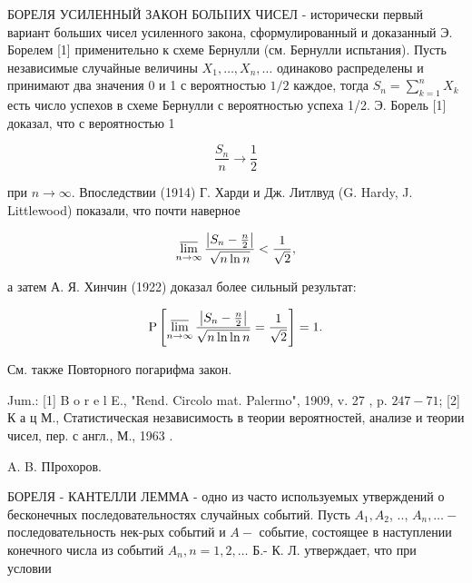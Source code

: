 \documentclass[10pt]{article}
\begin{document}
БОРЕЛЯ УСИЛЕННЫЙ ЗАКОН БОЛЬIIИХ ЧИСЕЛ - исторически первый вариант больших чисел усиленного закона, сформулированный и доказанный Э. Борелем [1] применительно к схеме Бернулли (см. Бернулли испьтания). Пусть независимые случайные величины $X_{1}, \ldots, X_{n}, \ldots$ одинаково распределены и принимают два значения 0 и 1 с вероятностью $1 / 2$ каждое, тогда $S_{n}=\sum_{k=1}^{n} X_{k}$ есть число успехов в схеме Бернулли с вероятностью успеха 1/2. Э. Борель [1] доказал, что с вероятностью 1



\[

\frac{S_{n}}{n} \longrightarrow \frac{1}{2}

\]



при $n \rightarrow \infty$. Впоследствии (1914) Г. Харди и Дж. Литлвуд (G. Hardy, J. Littlewood) показали, что почти наверное



\[

\varlimsup_{n \rightarrow \infty} \frac{\left|S_{n}-\frac{n}{2}\right|}{\sqrt{n \ln n}}<\frac{1}{\sqrt{2}},

\]



а затем А. Я. Хинчин (1922) доказал более сильный результат:



\[

\mathrm{P}\left[\varlimsup_{n \rightarrow \infty} \frac{\left|S_{n}-\frac{n}{2}\right|}{\sqrt{n \ln \ln n}}=\frac{1}{\sqrt{2}}\right]=1 .

\]



См. также Повторного погарифма закон.



Jum.: [1] B o r e l E., "Rend. Circolo mat. Palermo", 1909, v. 27 , p. $247-71$; [2] К а ц М., Статистическая независимость в теории вероятностей, анализе и теории чисел, пер. с англ., М., 1963 .



A. B. ПІрохоров.



БОРЕЛЯ - КАНТЕЛЛИ ЛЕММА - одно из часто используемых утверждений о бесконечных последовательностях случайных событий. Пусть $A_{1}, A_{2}$, .., $A_{n}, \ldots-$ последовательность нек-рых событий и $A-$ событие, состоящее в наступлении конечного числа из событий $A_{n}, n=1,2, \ldots$ Б.- К. Л. утверждает, что при условии
\end{document}
